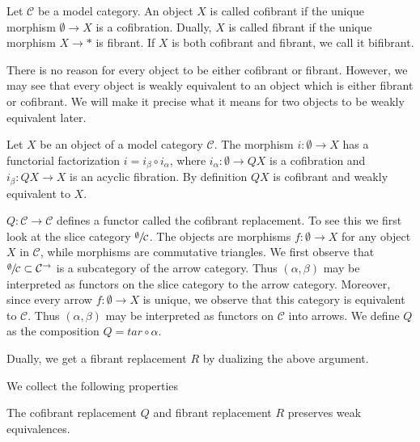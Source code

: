 \documentclass[../thesis.tex]{subfiles}
\begin{document}
            \begin{definition}
                Let $\mathcal{C}$ be a model category. An object $X$ is called cofibrant if the unique morphism $\emptyset \rightarrow X$ is a cofibration. Dually, $X$ is called fibrant if the unique morphism $X \rightarrow *$ is fibrant. If $X$ is both cofibrant and fibrant, we call it bifibrant.
            \end{definition}

            There is no reason for every object to be either cofibrant or fibrant. However, we may see that every object is weakly equivalent to an object which is either fibrant or cofibrant. We will make it precise what it means for two objects to be weakly equivalent later.

            \begin{construction}
                Let $X$ be an object of a model category $\mathcal{C}$. The morphism $i:\emptyset\rightarrow X$ has a functorial factorization $i=i_\beta\circ i_\alpha$, where $i_\alpha: \emptyset\rightarrow QX$ is a cofibration and $i_\beta: QX\rightarrow X$ is an acyclic fibration. By definition $QX$ is cofibrant and weakly equivalent to $X$.

                $Q: \mathcal{C}\rightarrow \mathcal{C}$ defines a functor called the cofibrant replacement. To see this we first look at the slice category $\sfrac{\emptyset}{\mathcal{C}}$. The objects are morphisms $f:\emptyset \rightarrow X$ for any object $X$ in $\mathcal{C}$, while morphisms are commutative triangles. We first observe that $\sfrac{\emptyset}{\mathcal{C}}\subset\mathcal{C}^\rightarrow$ is a subcategory of the arrow category. Thus $(\alpha, \beta)$ may be interpreted as functors on the slice category to the arrow category. Moreover, since every arrow $f:\emptyset \rightarrow X$ is unique, we observe that this category is equivalent to $\mathcal{C}$. Thus $(\alpha, \beta)$ may be interpreted as functors on $\mathcal{C}$ into arrows. We define $Q$ as the composition $Q = tar \circ \alpha$.

                Dually, we get a fibrant replacement $R$ by dualizing the above argument.
            \end{construction}

            We collect the following properties

            \begin{lemma}\label{lem: Q-preserves-weak}
                The cofibrant replacement $Q$ and fibrant replacement $R$ preserves weak equivalences. 
            \end{lemma}
\end{document}
